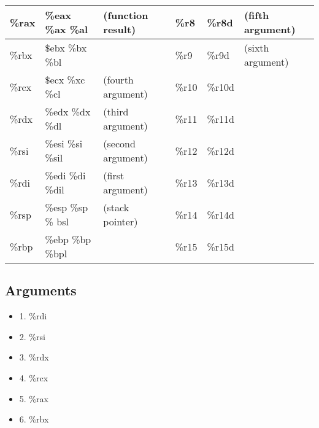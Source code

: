 \begin{tabular}{| l | l l | l | l l |}
    \hline 
    \%rax & \%eax \%ax \%al & (function result) & \%r8 & \%r8d & (fifth argument) \\
    \hline
    \%rbx & \$ebx \%bx \%bl & & \%r9 & \%r9d & (sixth argument) \\
    \hline 
    \%rcx & \$ecx \%xc \%cl & (fourth argument) & \%r10 & \%r10d & \\
    \hline 
    \%rdx & \%edx \%dx \%dl & (third argument)  & \%r11 & \%r11d & \\
    \hline 
    \%rsi & \%esi \%si \%sil & (second argument) & \%r12 & \%r12d & \\
    \hline 
    \%rdi & \%edi \%di \%dil & (first argument)  & \%r13 & \%r13d & \\
    \hline 
    \%rsp & \%esp \%sp \% bsl & (stack pointer)   & \%r14 & \%r14d & \\
    \hline 
    \%rbp & \%ebp \%bp \%bpl &                   & \%r15 & \%r15d & \\
    \hline 
\end{tabular}

\subsection*{Arguments}

\begin{itemize}
    \item 1. \%rdi \
    \item 2. \%rsi \
    \item 3. \%rdx \
    \item 4. \%rcx \
    \item 5. \%rax \
    \item 6. \%rbx \
\end{itemize}

